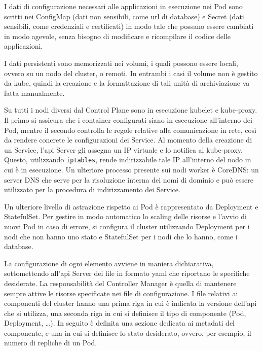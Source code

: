 \documentclass[12pt,a4paper,fleqn,titlepage]{report}
\begin{document}
        I dati di configurazione necessari alle applicazioni in esecuzione nei Pod sono scritti nei ConfigMap (dati non sensibili, come \gls{url} di database) e Secret (dati sensibili, come credenziali e certificati) in modo tale che possano essere cambiati in modo agevole, senza bisogno di modificare e ricompilare il codice delle applicazioni.

        I dati persistenti sono memorizzati nei volumi, i quali possono essere locali, ovvero su un nodo del \gls{cluster}, o remoti. In entrambi i casi il volume non è gestito da \gls{kube}, quindi la creazione e la formattazione di tali unità di archiviazione va fatta manualmente.

        Su tutti i nodi diversi dal Control Plane sono in esecuzione kubelet e kube-proxy. Il primo si assicura che i \gls{container} configurati siano in esecuzione all'interno dei Pod, mentre il secondo controlla le regole relative alla comunicazione in rete, così da rendere concrete le configurazioni dei Service. Al momento della creazione di un Service, l'\gls{api} Server gli assegna un IP virtuale e lo notifica al kube-proxy. Questo, utilizzando \lstinline{iptables}, rende indirizzabile tale IP all'interno del nodo in cui è in esecuzione. Un ulteriore processo presente sui nodi worker è CoreDNS: un server DNS che serve per la risoluzione interna dei nomi di dominio e può essere utilizzato per la procedura di indirizzamento dei Service.

        Un ulteriore livello di astrazione rispetto ai Pod è rappresentato da Deployment e StatefulSet. Per gestire in modo automatico lo scaling delle risorse e l'avvio di nuovi Pod in caso di errore, si configura il \gls{cluster} utilizzando Deployment per i nodi che non hanno uno stato e StatefulSet per i nodi che lo hanno, come i database.

        La configurazione di ogni elemento avviene in maniera dichiarativa, sottomettendo all'\gls{api} Server dei file in formato \gls{yaml} che riportano le specifiche desiderate. La responsabilità del Controller Manager è quella di mantenere sempre attive le risorse specificate nei file di configurazione.
        I file relativi ai componenti del \gls{cluster} hanno una prima riga in cui è indicata la versione dell'\gls{api} che si utilizza, una seconda riga in cui si definisce il tipo di componente (Pod, Deployment, \dots). In seguito è definita una sezione dedicata ai metadati del componente, e una in cui si definisce lo stato desiderato, ovvero, per esempio, il numero di repliche di un Pod.
\end{document}
